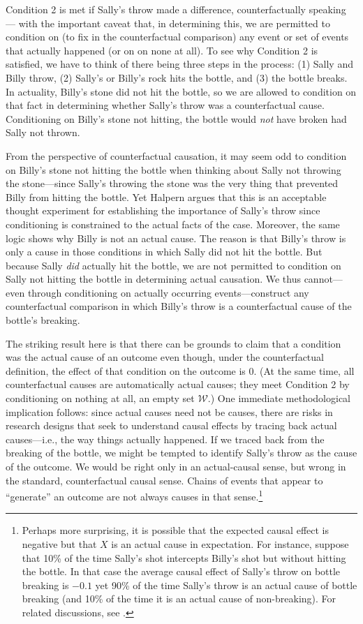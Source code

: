 \documentclass[
  12pt,
]{book}
\begin{document}
Condition 2 is met if Sally's throw made a difference, counterfactually speaking --- with the important caveat that, in determining this, we are permitted to condition on (to fix in the counterfactual comparison) any event or set of events that actually happened (or on on none at all). To see why Condition 2 is satisfied, we have to think of there being three steps in the process: (1) Sally and Billy throw, (2) Sally's or Billy's rock hits the bottle, and (3) the bottle breaks. In actuality, Billy's stone did not hit the bottle, so we are allowed to condition on that fact in determining whether Sally's throw was a counterfactual cause. Conditioning on Billy's stone not hitting, the bottle would \emph{not} have broken had Sally not thrown.

From the perspective of counterfactual causation, it may seem odd to condition on Billy's stone not hitting the bottle when thinking about Sally not throwing the stone---since Sally's throwing the stone was the very thing that prevented Billy from hitting the bottle. Yet Halpern argues that this is an acceptable thought experiment for establishing the importance of Sally's throw since conditioning is constrained to the actual facts of the case. Moreover, the same logic shows why Billy is not an actual cause. The reason is that Billy's throw is only a cause in those conditions in which Sally did not hit the bottle. But because Sally \emph{did} actually hit the bottle, we are not permitted to condition on Sally not hitting the bottle in determining actual causation. We thus cannot---even through conditioning on actually occurring events---construct any counterfactual comparison in which Billy's throw is a counterfactual cause of the bottle's breaking.

The striking result here is that there can be grounds to claim that a condition was the actual cause of an outcome even though, under the counterfactual definition, the effect of that condition on the outcome is 0. (At the same time, all counterfactual causes are automatically actual causes; they meet Condition 2 by conditioning on nothing at all, an empty set \(\mathcal W\).) One immediate methodological implication follows: since actual causes need not be causes, there are risks in research designs that seek to understand causal effects by tracing back actual causes---i.e., the way things actually happened. If we traced back from the breaking of the bottle, we might be tempted to identify Sally's throw as the cause of the outcome. We would be right only in an actual-causal sense, but wrong in the standard, counterfactual causal sense. Chains of events that appear to ``generate'' an outcome are not always causes in that sense.\footnote{Perhaps more surprising, it is possible that the expected causal effect is negative but that \(X\) is an actual cause in expectation. For instance, suppose that 10\% of the time Sally's shot intercepts Billy's shot but without hitting the bottle. In that case the average causal effect of Sally's throw on bottle breaking is \(-0.1\) yet 90\% of the time Sally's throw is an actual cause of bottle breaking (and 10\% of the time it is an actual cause of non-breaking). For related discussions, see \citet{menzies1989probabilistic}.}
\end{document}
